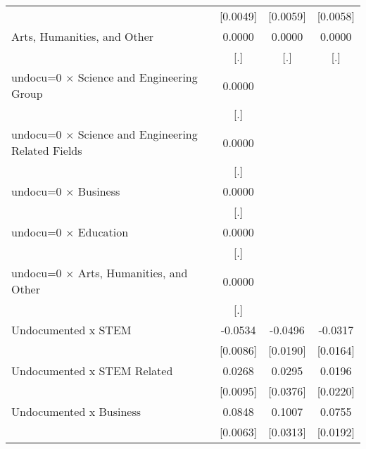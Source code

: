\begin{table}[htbp]
\begin{tabular}{l*{3}{c}}
                    &    [0.0049]         &    [0.0059]         &    [0.0058]         \\
\addlinespace
Arts, Humanities, and Other&      0.0000         &      0.0000         &      0.0000         \\
                    &         [.]         &         [.]         &         [.]         \\
\addlinespace
undocu=0 $\times$ Science and Engineering Group&      0.0000         &                     &                     \\
                    &         [.]         &                     &                     \\
\addlinespace
undocu=0 $\times$ Science and Engineering Related Fields&      0.0000         &                     &                     \\
                    &         [.]         &                     &                     \\
\addlinespace
undocu=0 $\times$ Business&      0.0000         &                     &                     \\
                    &         [.]         &                     &                     \\
\addlinespace
undocu=0 $\times$ Education&      0.0000         &                     &                     \\
                    &         [.]         &                     &                     \\
\addlinespace
undocu=0 $\times$ Arts, Humanities, and Other&      0.0000         &                     &                     \\
                    &         [.]         &                     &                     \\
\addlinespace
Undocumented x STEM &     -0.0534\sym{***}&     -0.0496\sym{**} &     -0.0317\sym{*}  \\
                    &    [0.0086]         &    [0.0190]         &    [0.0164]         \\
\addlinespace
Undocumented x STEM Related&      0.0268\sym{***}&      0.0295         &      0.0196         \\
                    &    [0.0095]         &    [0.0376]         &    [0.0220]         \\
\addlinespace
Undocumented x Business&      0.0848\sym{***}&      0.1007\sym{***}&      0.0755\sym{***}\\
                    &    [0.0063]         &    [0.0313]         &    [0.0192]         \\

\end{tabular}
\end{table}
